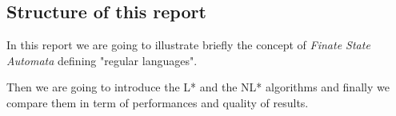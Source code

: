 \subsection{Structure of this report}
In this report we are going to illustrate briefly the concept of \textit{Finate State Automata} defining "regular languages".

Then we are going to introduce the L* \cite{angluinL} and the NL* \cite{angluinNL} algorithms and finally we compare them in term of performances and quality of results.